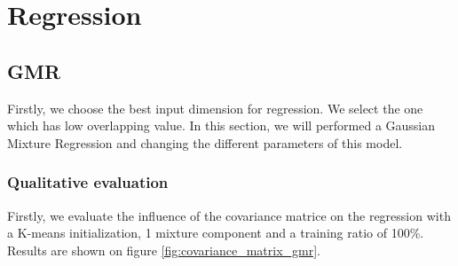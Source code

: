 \section{Regression}
\label{regression}

\subsection{GMR} 


Firstly, we choose the best input dimension for regression. We select the one which has low overlapping value.
In this section, we will performed a Gaussian Mixture Regression and changing the different parameters of this model. 
\subsubsection{Qualitative evaluation}
Firstly, we evaluate the influence of the covariance matrice on the regression with a K-means initialization, 1 mixture component and a training ratio of 100\%. Results are shown on figure \ref{fig:covariance_matrix_gmr}.

